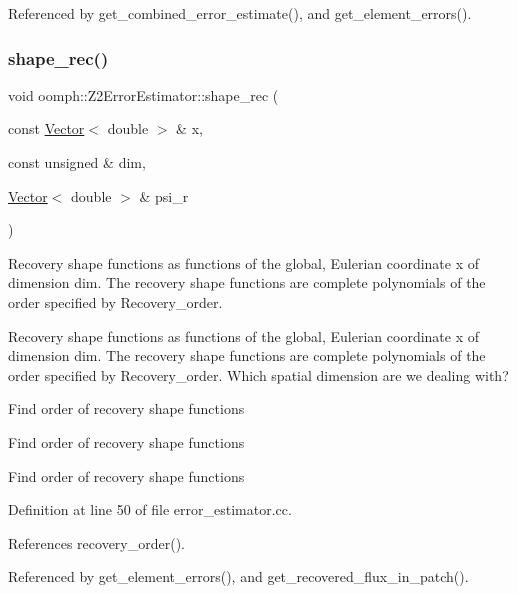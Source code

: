 Referenced by get\+\_\+combined\+\_\+error\+\_\+estimate(), and get\+\_\+element\+\_\+errors().

\mbox{\label{classoomph_1_1Z2ErrorEstimator_ab57514ecde88f7ae970439fd4900996a}} 
\subsubsection{\texorpdfstring{shape\+\_\+rec()}{shape\_rec()}}
{\footnotesize\ttfamily void oomph\+::\+Z2\+Error\+Estimator\+::shape\+\_\+rec (\begin{DoxyParamCaption}\item[{const \hyperlink{classoomph_1_1Vector}{Vector}$<$ double $>$ \&}]{x,  }\item[{const unsigned \&}]{dim,  }\item[{\hyperlink{classoomph_1_1Vector}{Vector}$<$ double $>$ \&}]{psi\+\_\+r }\end{DoxyParamCaption})\hspace{0.3cm}{\ttfamily [private]}}



Recovery shape functions as functions of the global, Eulerian coordinate x of dimension dim. The recovery shape functions are complete polynomials of the order specified by Recovery\+\_\+order. 

Recovery shape functions as functions of the global, Eulerian coordinate x of dimension dim. The recovery shape functions are complete polynomials of the order specified by Recovery\+\_\+order. Which spatial dimension are we dealing with?

Find order of recovery shape functions

Find order of recovery shape functions

Find order of recovery shape functions 

Definition at line 50 of file error\+\_\+estimator.\+cc.



References recovery\+\_\+order().



Referenced by get\+\_\+element\+\_\+errors(), and get\+\_\+recovered\+\_\+flux\+\_\+in\+\_\+patch().



